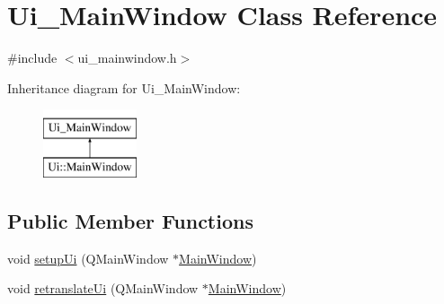 \hypertarget{class_ui___main_window}{}\section{Ui\+\_\+\+Main\+Window Class Reference}
\label{class_ui___main_window}


{\ttfamily \#include $<$ui\+\_\+mainwindow.\+h$>$}

Inheritance diagram for Ui\+\_\+\+Main\+Window\+:\begin{figure}[H]
\begin{center}
\leavevmode
\includegraphics[height=2.000000cm]{class_ui___main_window}
\end{center}
\end{figure}
\subsection*{Public Member Functions}
\begin{DoxyCompactItemize}
\item 
void \hyperlink{class_ui___main_window_acf4a0872c4c77d8f43a2ec66ed849b58}{setup\+Ui} (Q\+Main\+Window $\ast$\hyperlink{class_main_window}{Main\+Window})
\item 
void \hyperlink{class_ui___main_window_a097dd160c3534a204904cb374412c618}{retranslate\+Ui} (Q\+Main\+Window $\ast$\hyperlink{class_main_window}{Main\+Window})
\end{DoxyCompactItemize}
